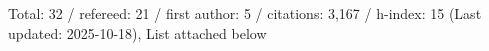 Total: 32 / refereed: 21 / first author: 5 / citations: 3,167 / h-index: 15 (Last updated: 2025-10-18), List attached below